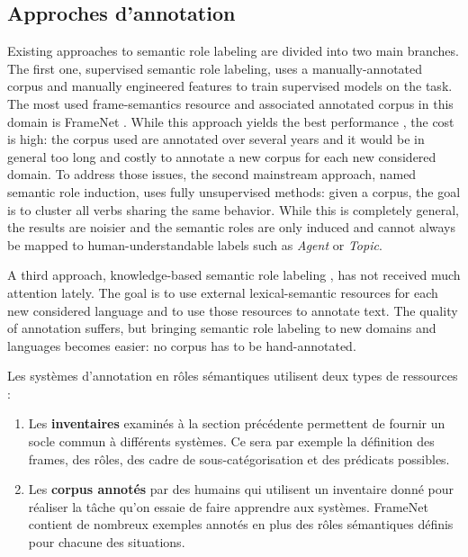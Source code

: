 
\subsection{Approches d'annotation}

Existing approaches to semantic role labeling are divided into two main
branches. The first one, supervised semantic role labeling, uses a
manually-annotated corpus and manually engineered features to train supervised
models on the task. The most used frame-semantics resource and associated
annotated corpus in this domain is FrameNet \citep{baker1998berkeley}.
While this approach yields the best performance \citep{das2014frame}, the
cost is high: the corpus used are annotated over several years and it would be
in general too long and costly to annotate a new corpus for each new considered
domain. To address those issues, the second mainstream approach, named semantic
role induction, uses fully unsupervised methods: given a corpus, the goal is to
cluster all verbs sharing the same behavior. While this is completely general,
the results are noisier and the semantic roles are only induced and cannot
always be mapped to human-understandable labels such as \textit{Agent} or
\textit{Topic}.

A third approach, knowledge-based semantic role labeling
\citep{swier2004unsupervised,swier2005exploiting}, has not received much
attention lately. The goal is to use external lexical-semantic resources for
each new considered language and to use those resources to annotate text. The
quality of annotation suffers, but bringing semantic role labeling to new
domains and languages becomes easier: no corpus has to be hand-annotated.

Les systèmes d'annotation en rôles sémantiques utilisent deux types de
ressources :

\begin{enumerate}
    \item Les \textbf{inventaires} examinés à la section précédente permettent
        de fournir un socle commun à différents systèmes. Ce sera par exemple
        la définition des frames, des rôles, des cadre de sous-catégorisation
        et des prédicats possibles.
    \item Les \textbf{corpus annotés} par des humains qui utilisent un
        inventaire donné pour réaliser la tâche qu'on essaie de faire apprendre
        aux systèmes. FrameNet contient de nombreux exemples annotés en plus
        des rôles sémantiques définis pour chacune des situations.
\end{enumerate}

